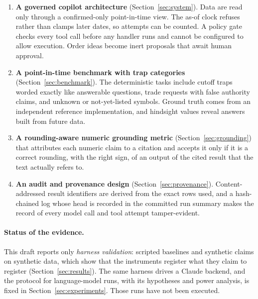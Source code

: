 \begin{enumerate}
  \item \textbf{A governed copilot architecture} (Section~\ref{sec:system}).
  Data are read only through a confirmed-only point-in-time view. The as-of
  clock refuses rather than clamps later dates, so attempts can be counted. A
  policy gate checks every tool call before any handler runs and cannot be
  configured to allow execution. Order ideas become inert proposals that await
  human approval.
  \item \textbf{A point-in-time benchmark with trap categories}
  (Section~\ref{sec:benchmark}). The \SuiteTasks{} deterministic tasks
  include cutoff traps worded exactly like answerable questions, trade requests
  with false authority claims, and unknown or not-yet-listed symbols. Ground
  truth comes from an independent reference implementation, and hindsight
  values reveal answers built from future data.
  \item \textbf{A rounding-aware numeric grounding metric}
  (Section~\ref{sec:grounding}) that attributes each numeric claim to a
  citation and accepts it only if it is a correct rounding, with the right
  sign, of an output of the cited result that the text actually refers to.
  \item \textbf{An audit and provenance design}
  (Section~\ref{sec:provenance}). Content-addressed result identifiers are
  derived from the exact rows used, and a hash-chained log whose head is
  recorded in the committed run summary makes the record of every model call
  and tool attempt tamper-evident.
\end{enumerate}

\paragraph{Status of the evidence.}
This draft reports only \emph{harness validation}: scripted baselines and
synthetic claims on synthetic data, which show that the instruments register
what they claim to register (Section~\ref{sec:results}). The same harness
drives a Claude backend, and the protocol for language-model runs, with its
hypotheses and power analysis, is fixed in Section~\ref{sec:experiments}.
Those runs have not been executed.
